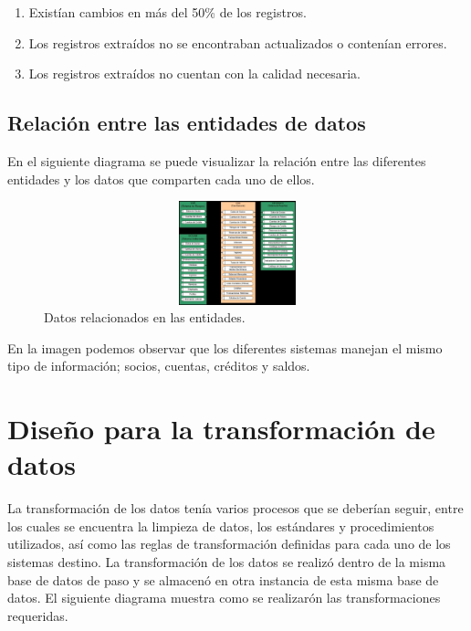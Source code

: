 \documentclass[a4paper,openright,12pt]{book}
\begin{document}
\begin{enumerate}
\item Existían cambios en más del 50\% de los registros.
\item Los registros extraídos no se encontraban actualizados o contenían
  errores.
\item Los registros extraídos no cuentan con la calidad necesaria.
\end{enumerate}

\subsection{Relación entre las entidades de datos}

En el siguiente diagrama se puede visualizar la relación entre las diferentes
entidades y los datos que comparten cada uno de ellos.

\begin{figure}[htb]
  \begin{center}
    \includegraphics[width=12cm, height=3cm, scale=0.5]{Relacion_entidades.jpg}
        \caption{Datos relacionados en las entidades.}
    \label{fig:arquitectura}
  \end{center}
\end{figure}

En la imagen podemos observar que los diferentes sistemas manejan el mismo tipo
de información; socios, cuentas, créditos y saldos.

\section{Diseño para la transformación de datos}

La transformación de los datos tenía varios procesos que se deberían seguir,
entre los cuales se encuentra la limpieza de datos, los estándares y
procedimientos utilizados, así como las reglas de transformación definidas para
cada uno de los sistemas destino. La transformación de los datos se realizó
dentro de la misma base de datos de paso y se almacenó en otra instancia de esta
misma base de datos. El siguiente diagrama muestra como se realizarón las
transformaciones requeridas.
\end{document}
